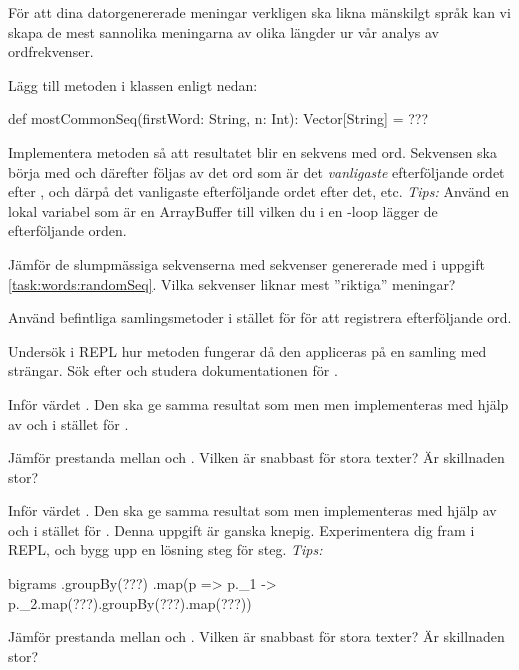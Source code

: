 \Task \label{task:words:mostCommonSeq} För att dina datorgenererade meningar verkligen ska likna mänskilgt språk kan vi skapa de mest sannolika meningarna av olika längder ur vår analys av ordfrekvenser.

Lägg till metoden  i klassen  enligt nedan:
\begin{Code}
def mostCommonSeq(firstWord: String, n: Int): Vector[String] = ???
\end{Code}
\Subtask Implementera metoden så att resultatet blir en sekvens med  ord. Sekvensen ska börja med  och därefter följas av det ord som är det \emph{vanligaste} efterföljande ordet efter , och därpå det vanligaste efterföljande ordet efter det, etc. \emph{Tips:} Använd en lokal variabel  som är en ArrayBuffer till vilken du i en -loop lägger de efterföljande orden.

\Subtask Jämför de slumpmässiga sekvenserna med sekvenser genererade med  i uppgift \ref{task:words:randomSeq}. Vilka sekvenser liknar mest ''riktiga'' meningar?


\Task Använd befintliga samlingsmetoder i stället för  för att registrera efterföljande ord.

\Subtask Undersök i REPL hur metoden  fungerar då den appliceras på en samling med strängar. Sök efter och studera dokumentationen för .

\Subtask Inför värdet . Den ska ge samma resultat som  men men implementeras med hjälp av  och  i stället för .

\Subtask\Uberkurs Jämför prestanda mellan  och . Vilken är snabbast för stora texter? Är skillnaden stor?

\Subtask Inför värdet . Den ska ge samma resultat som  men implementeras med hjälp av  och  i stället för .
Denna uppgift är ganska knepig. Experimentera dig fram i REPL, och bygg upp en lösning steg för steg. \emph{Tips:}
\begin{Code}
bigrams
  .groupBy(???)
  .map(p => p._1 -> p._2.map(???).groupBy(???).map(???))
\end{Code}

\Subtask\Uberkurs Jämför prestanda mellan  och . Vilken är snabbast för stora texter? Är skillnaden stor?

